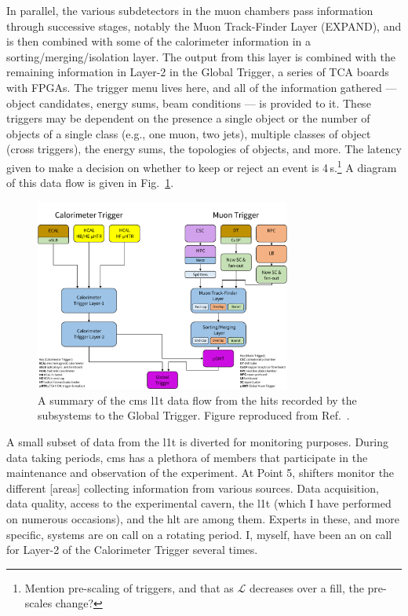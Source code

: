 In parallel, the various subdetectors in the muon chambers pass information through successive stages, notably the Muon Track-Finder Layer (EXPAND), and is then combined with some of the calorimeter information in a sorting/merging/isolation layer. The output from this layer is combined with the remaining information in Layer-2 in the Global Trigger, a series of \si{\micro}TCA boards with FPGAs. The trigger menu lives here, and all of the information gathered --- object candidates, energy sums, beam conditions --- is provided to it. These triggers may be dependent on the presence a single object or the number of objects of a single class (e.g., one muon, two \glspl{jet}), multiple classes of object (cross triggers), the energy sums, the topologies of objects, and more. The latency given to make a decision on whether to keep or reject an event is 4\,\si{\micro}s.\footnote{Mention pre-scaling of triggers, and that as $\mathcal{L}$ decreases over a fill, the pre-scales change?} A diagram of this data flow is given in Fig.~\ref{fig:cms_l1t_data_flow}.

\begin{figure}[htbp]
    \centering
    \includegraphics[width=0.75\textwidth]{figures/CMS_L1T_data_flow_key_ordered.pdf}
    \caption[A summary of the CMS Level-1 Trigger data flow from the hits recorded by the subsystems to the Global Trigger]{A summary of the \acrshort{cms} \acrlong{l1t} data flow from the hits recorded by the subsystems to the Global Trigger. Figure reproduced from Ref.~\cite{Dev_2017}.}
    \label{fig:cms_l1t_data_flow}
\end{figure}

A small subset of data from the \acrshort{l1t} is diverted for monitoring purposes. During data taking periods, \acrshort{cms} has a plethora of members that participate in the maintenance and observation of the experiment. At Point 5, shifters monitor the different [areas] collecting information from various sources. Data acquisition, data quality, access to the experimental cavern, the \acrshort{l1t} (which I have performed on numerous occasions), and the \acrshort{hlt} are among them. Experts in these, and more specific, systems are on call on a rotating period. I, myself, have been an on call for Layer-2 of the Calorimeter Trigger several times.

